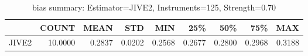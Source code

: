 \begin{table}[ht]
\centering
\caption{bias summary: Estimator=JIVE2, Instruments=125, Strength=0.70}
\begin{tabular}{lrrrrrrrr}
\toprule
 & COUNT & MEAN & STD & MIN & 25\% & 50\% & 75\% & MAX \\
\midrule
JIVE2 & 10.0000 & 0.2837 & 0.0202 & 0.2568 & 0.2677 & 0.2800 & 0.2968 & 0.3188 \\
\bottomrule
\end{tabular}
\end{table}
